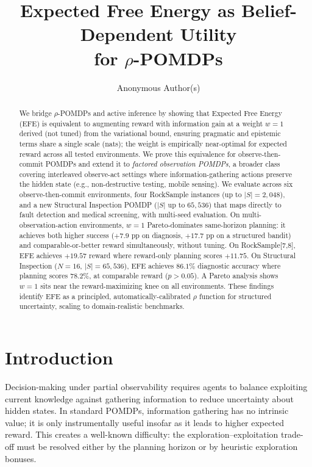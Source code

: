 \documentclass{article}
\title{Expected Free Energy as Belief-Dependent Utility\\ for $\rho$-POMDPs}
\author{%
  Anonymous Author(s)
}
\begin{document}
\maketitle

\begin{abstract}
We bridge $\rho$-POMDPs and active inference by showing that Expected Free Energy (EFE) is equivalent to augmenting reward with information gain at a weight $w{=}1$ derived (not tuned) from the variational bound, ensuring pragmatic and epistemic terms share a single scale (nats); the weight is empirically near-optimal for expected reward across all tested environments. We prove this equivalence for observe-then-commit POMDPs and extend it to \emph{factored observation POMDPs}, a broader class covering interleaved observe-act settings where information-gathering actions preserve the hidden state (e.g., non-destructive testing, mobile sensing). We evaluate across six observe-then-commit environments, four RockSample instances (up to $|S|{=}2{,}048$), and a new Structural Inspection POMDP ($|S|$ up to $65{,}536$) that maps directly to fault detection and medical screening, with multi-seed evaluation. On multi-observation-action environments, $w{=}1$ Pareto-dominates same-horizon planning: it achieves both higher success ($+7.9$ pp on diagnosis, $+17.7$ pp on a structured bandit) and comparable-or-better reward simultaneously, without tuning. On RockSample[7,8], EFE achieves $+19.57$ reward where reward-only planning scores $+11.75$. On Structural Inspection ($N{=}16$, $|S|{=}65{,}536$), EFE achieves $86.1\%$ diagnostic accuracy where planning scores $78.2\%$, at comparable reward ($p > 0.05$). A Pareto analysis shows $w{=}1$ sits near the reward-maximizing knee on all environments. These findings identify EFE as a principled, automatically-calibrated $\rho$ function for structured uncertainty, scaling to domain-realistic benchmarks.
\end{abstract}

\section{Introduction}

Decision-making under partial observability requires agents to balance exploiting current knowledge against gathering information to reduce uncertainty about hidden states. In standard POMDPs, information gathering has no intrinsic value; it is only instrumentally useful insofar as it leads to higher expected reward. This creates a well-known difficulty: the exploration--exploitation trade-off must be resolved either by the planning horizon or by heuristic exploration bonuses.
\end{document}
